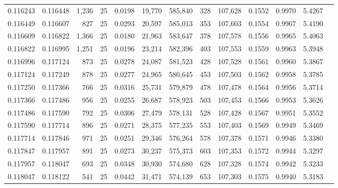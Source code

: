 \begin{tabular}{rrrrrrrrrrrrr}
0.116243 & 0.116448 & 1,236 &  25 &                                     0.0198 &  19,770 & 585,840 &     328 & 107,628 & 0.1552 & 0.9970 & 5.4267 \\
0.116449 & 0.116607 &   827 &  25 &                                     0.0293 &  20,597 & 585,013 &     353 & 107,603 & 0.1554 & 0.9967 & 5.4190 \\
0.116609 & 0.116822 & 1,366 &  25 &                                     0.0180 &  21,963 & 583,647 &     378 & 107,578 & 0.1556 & 0.9965 & 5.4063 \\
0.116822 & 0.116995 & 1,251 &  25 &                                     0.0196 &  23,214 & 582,396 &     403 & 107,553 & 0.1559 & 0.9963 & 5.3948 \\
0.116996 & 0.117124 &   873 &  25 &                                     0.0278 &  24,087 & 581,523 &     428 & 107,528 & 0.1561 & 0.9960 & 5.3867 \\
0.117124 & 0.117249 &   878 &  25 &                                     0.0277 &  24,965 & 580,645 &     453 & 107,503 & 0.1562 & 0.9958 & 5.3785 \\
0.117250 & 0.117366 &   766 &  25 &                                     0.0316 &  25,731 & 579,879 &     478 & 107,478 & 0.1564 & 0.9956 & 5.3714 \\
0.117366 & 0.117486 &   956 &  25 &                                     0.0255 &  26,687 & 578,923 &     503 & 107,453 & 0.1566 & 0.9953 & 5.3626 \\
0.117486 & 0.117590 &   792 &  25 &                                     0.0306 &  27,479 & 578,131 &     528 & 107,428 & 0.1567 & 0.9951 & 5.3552 \\
0.117590 & 0.117714 &   896 &  25 &                                     0.0271 &  28,375 & 577,235 &     553 & 107,403 & 0.1569 & 0.9949 & 5.3469 \\
0.117714 & 0.117846 &   971 &  25 &                                     0.0251 &  29,346 & 576,264 &     578 & 107,378 & 0.1571 & 0.9946 & 5.3380 \\
0.117847 & 0.117957 &   891 &  25 &                                     0.0273 &  30,237 & 575,373 &     603 & 107,353 & 0.1572 & 0.9944 & 5.3297 \\
0.117957 & 0.118047 &   693 &  25 &                                     0.0348 &  30,930 & 574,680 &     628 & 107,328 & 0.1574 & 0.9942 & 5.3233 \\
0.118047 & 0.118122 &   541 &  25 &                                     0.0442 &  31,471 & 574,139 &     653 & 107,303 & 0.1575 & 0.9940 & 5.3183 \\

\end{tabular}

